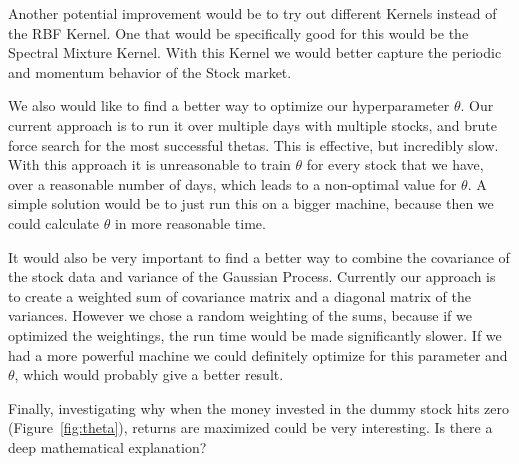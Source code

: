 \documentclass{article}
\begin{document}
Another potential improvement would be to try out different Kernels instead of the RBF Kernel.  One that would be specifically good for this would be the Spectral Mixture Kernel. \cite{spectral} With this Kernel we would better capture the periodic and momentum behavior of the Stock market.

We also would like to find a better way to optimize our hyperparameter $\theta$.  Our current approach is to run it over multiple days with multiple stocks, and brute force search for the most successful thetas.  This is effective, but incredibly slow.  With this approach it is unreasonable to train $\theta$ for every stock that we have, over a reasonable number of days, which leads to a non-optimal value for $\theta$.  A simple solution would be to just run this on a bigger machine, because then we could calculate $\theta$ in more reasonable time. 

It would also be very important to find a better way to combine the covariance of the stock data and variance of the Gaussian Process.  Currently our approach is to create a weighted sum of covariance matrix and a diagonal matrix of the variances. However we chose a random weighting of the sums, because if we optimized the weightings, the run time would be made significantly slower. If we had a more powerful machine we could definitely optimize for this parameter and $\theta$, which would probably give a better result.

Finally, investigating why when the money invested in the dummy stock hits zero (Figure~\ref{fig:theta}), returns are maximized could be very interesting. Is there a deep mathematical explanation?

\newpage



\end{document}
